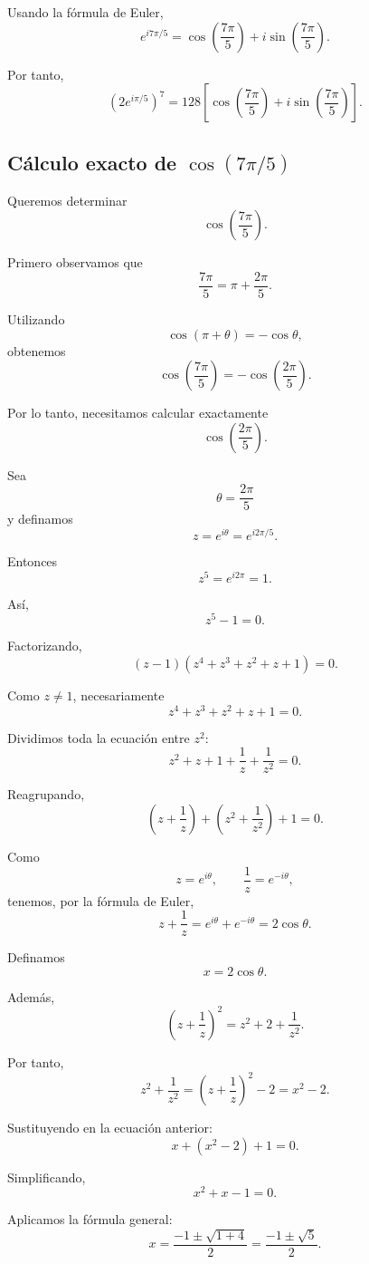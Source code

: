 \documentclass[12pt]{article}
\begin{document}
Usando la fórmula de Euler,
\[
e^{i7\pi/5}
=
\cos\left(\frac{7\pi}{5}\right)
+
i\sin\left(\frac{7\pi}{5}\right).
\]

Por tanto,
\[
\boxed{
\left(2e^{i\pi/5}\right)^7
=
128\left[
\cos\left(\frac{7\pi}{5}\right)
+
i\sin\left(\frac{7\pi}{5}\right)
\right]
}.
\]

\subsection{Cálculo exacto de $\cos(7\pi/5)$}

Queremos determinar
\[
\cos\left(\frac{7\pi}{5}\right).
\]

Primero observamos que
\[
\frac{7\pi}{5}
=
\pi+\frac{2\pi}{5}.
\]

Utilizando
\[
\cos(\pi+\theta)=-\cos\theta,
\]
obtenemos
\[
\cos\left(\frac{7\pi}{5}\right)
=
-\cos\left(\frac{2\pi}{5}\right).
\]

Por lo tanto, necesitamos calcular exactamente
\[
\cos\left(\frac{2\pi}{5}\right).
\]

Sea
\[
\theta=\frac{2\pi}{5}
\]
y definamos
\[
z=e^{i\theta}=e^{i2\pi/5}.
\]

Entonces
\[
z^5=e^{i2\pi}=1.
\]

Así,
\[
z^5-1=0.
\]

Factorizando,
\[
(z-1)
\left(
z^4+z^3+z^2+z+1
\right)=0.
\]

Como $z\neq 1$, necesariamente
\[
z^4+z^3+z^2+z+1=0.
\]

Dividimos toda la ecuación entre $z^2$:
\[
z^2+z+1+\frac{1}{z}+\frac{1}{z^2}=0.
\]

Reagrupando,
\[
\left(z+\frac{1}{z}\right)
+
\left(z^2+\frac{1}{z^2}\right)
+1=0.
\]

Como
\[
z=e^{i\theta},
\qquad
\frac{1}{z}=e^{-i\theta},
\]
tenemos, por la fórmula de Euler,
\[
z+\frac{1}{z}
=
e^{i\theta}+e^{-i\theta}
=
2\cos\theta.
\]

Definamos
\[
x=2\cos\theta.
\]

Además,
\[
\left(z+\frac{1}{z}\right)^2
=
z^2+2+\frac{1}{z^2}.
\]

Por tanto,
\[
z^2+\frac{1}{z^2}
=
\left(z+\frac{1}{z}\right)^2-2
=
x^2-2.
\]

Sustituyendo en la ecuación anterior:
\[
x+(x^2-2)+1=0.
\]

Simplificando,
\[
x^2+x-1=0.
\]

Aplicamos la fórmula general:
\[
x
=
\frac{-1\pm\sqrt{1+4}}{2}
=
\frac{-1\pm\sqrt{5}}{2}.
\]
\end{document}
